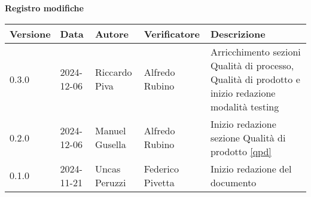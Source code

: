\documentclass[11pt]{article}
\begin{document}
\begin{center}
\textbf{Registro modifiche}\\
\vspace{2mm}
\begin{tabularx}{\textwidth}{|l|l|l|l|X|}
\hline
\textbf{Versione} & \textbf{Data} & \textbf{Autore} & \textbf{Verificatore} & \textbf{Descrizione} \\
\hline
0.3.0 & 2024-12-06 & Riccardo Piva & Alfredo Rubino & Arricchimento sezioni Qualità di processo, Qualità di prodotto e inizio redazione modalità testing \\
\hline
0.2.0 & 2024-12-06 & Manuel Gusella  & Alfredo Rubino & Inizio redazione sezione Qualità di prodotto \ref{qpd}\\
\hline
0.1.0 & 2024-11-21 & Uncas Peruzzi  & Federico Pivetta & Inizio redazione del documento\\
\hline
\end{tabularx}
\end{center}
\newpage
\tableofcontents
\listoffigures %
\listoftables %
\newpage
\end{document}
